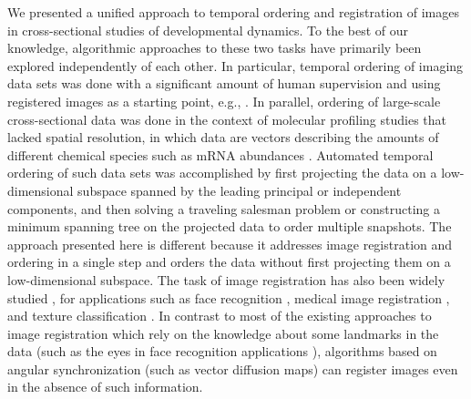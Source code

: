 \documentclass{pnastwo}
\begin{document}
\begin{article}
We presented a unified approach to temporal ordering and registration of images in cross-sectional studies of developmental dynamics. 
%
To the best of our knowledge, algorithmic approaches to these two tasks have primarily been explored independently of each other. 
%
In particular, temporal ordering of imaging data sets was done with a significant amount of human supervision and using registered images as a starting point, e.g., \cite{yuan2014automated, surkova2008characterization}.  
%
In parallel, ordering of large-scale cross-sectional data was done in the context of molecular profiling studies that lacked spatial resolution, in which data are vectors describing the amounts of different chemical species such as mRNA abundances \cite{trapnell2014dynamics, anavy2014blind, gupta2008extracting}. 
%
Automated temporal ordering of such data sets was accomplished by first projecting the data on a low-dimensional subspace spanned by the leading principal or independent components, and then solving a traveling salesman problem or constructing a minimum spanning tree on the projected data to order multiple snapshots. 
%
The approach presented here is different because it addresses image registration and ordering in a single step and orders the data without first projecting them on a low-dimensional subspace. 
%
The task of image registration has also been widely studied \cite{zitova2003image}, for applications such as face recognition \cite{rowley1998rotation}, medical image registration \cite{hajnal2010medical}, and texture classification \cite{greenspan1994rotation}.
%
In contrast to most of the existing approaches to image registration which rely on the knowledge about some landmarks in the data \cite{ian1998statistical} (such as the eyes in face recognition applications \cite{zhao2003face}), algorithms based on angular synchronization (such as vector diffusion maps) can register images even in the absence of such information. 


\end{article}
\end{document}
